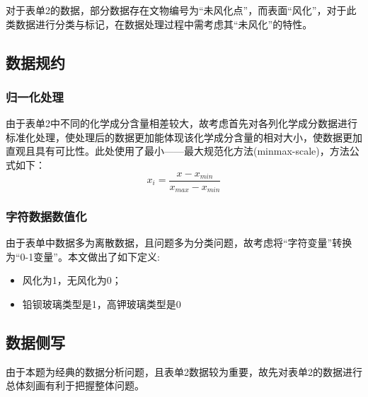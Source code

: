 \documentclass[withoutpreface,bwprint]{cumcmthesis} %
\begin{document}
对于表单2的数据，部分数据存在文物编号为“未风化点”，而表面“风化”，对于此类数据进行分类与标记，在数据处理过程中需考虑其“未风化”的特性。


\subsection{数据规约}
\subsubsection{归一化处理}
由于表单2中不同的化学成分含量相差较大，故考虑首先对各列化学成分数据进行标准化处理，使处理后的数据更加能体现该化学成分含量的相对大小，使数据更加直观且具有可比性。此处使用了最小——最大规范化方法(minmax-scale)，方法公式如下： $$ x_{i} = \frac{x-x_{min}}{x_{max}-x_{min}}$$

\subsubsection{字符数据数值化}

由于表单中数据多为离散数据，且问题多为分类问题，故考虑将“字符变量”转换为“0-1变量”。本文做出了如下定义:

\begin{itemize}
	\item 风化为1，无风化为0；
	\item 铅钡玻璃类型是1，高钾玻璃类型是0
\end{itemize}

\subsection{数据侧写}

由于本题为经典的数据分析问题，且表单2数据较为重要，故先对表单2的数据进行总体刻画有利于把握整体问题。
\end{document}
